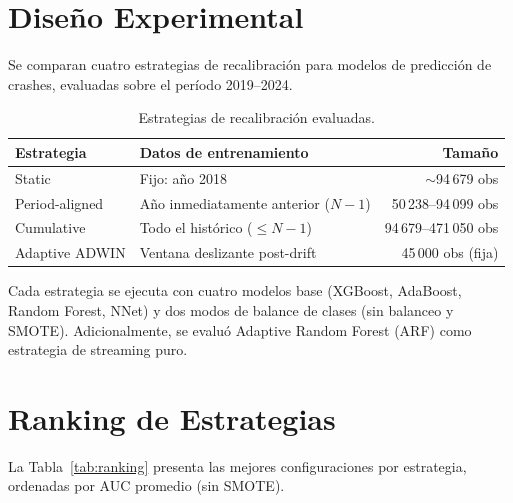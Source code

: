 \documentclass[11pt,a4paper]{article}
\begin{document}
\section{Diseño Experimental}

Se comparan cuatro estrategias de recalibración para modelos de predicción de crashes, evaluadas sobre el período 2019--2024.

\begin{table}[H]
\centering
\caption{Estrategias de recalibración evaluadas.}
\label{tab:estrategias}
\begin{tabular}{@{}llr@{}}
\toprule
\textbf{Estrategia} & \textbf{Datos de entrenamiento} & \textbf{Tamaño} \\
\midrule
Static          & Fijo: año 2018                        & $\sim$94\,679 obs \\
Period-aligned  & Año inmediatamente anterior ($N{-}1$) & 50\,238--94\,099 obs \\
Cumulative      & Todo el histórico ($\leq N{-}1$)      & 94\,679--471\,050 obs \\
Adaptive ADWIN  & Ventana deslizante post-drift          & 45\,000 obs (fija) \\
\bottomrule
\end{tabular}
\end{table}

Cada estrategia se ejecuta con cuatro modelos base (XGBoost, AdaBoost, Random Forest, NNet) y dos modos de balance de clases (sin balanceo y SMOTE). Adicionalmente, se evaluó Adaptive Random Forest (ARF) como estrategia de streaming puro.

\section{Ranking de Estrategias}

La Tabla~\ref{tab:ranking} presenta las mejores configuraciones por estrategia, ordenadas por AUC promedio (sin SMOTE).
\end{document}
